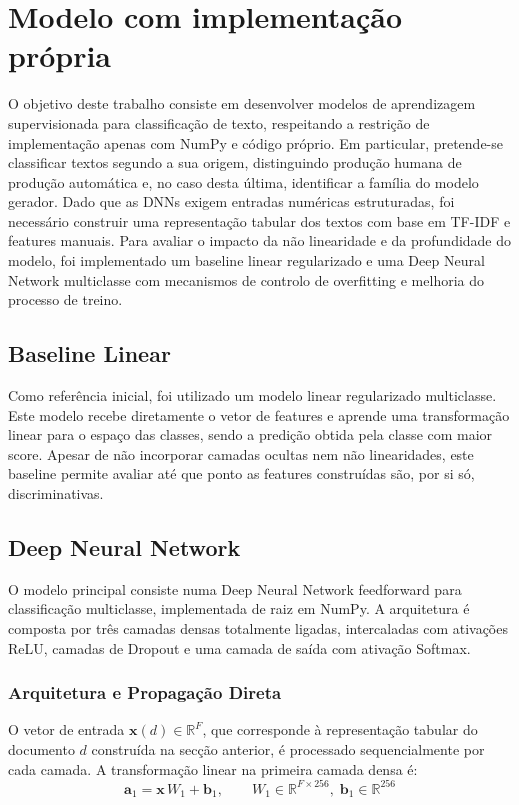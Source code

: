 \documentclass[a4paper,12pt]{scrreprt}
\begin{document}
    \section{Modelo com implementação própria}
        O objetivo deste trabalho consiste em desenvolver modelos de aprendizagem supervisionada para classificação de texto, respeitando a restrição de implementação apenas com NumPy e código próprio. Em particular, pretende-se classificar textos segundo a sua origem, distinguindo produção humana de produção automática e, no caso desta última, identificar a família do modelo gerador. Dado que as DNNs exigem entradas numéricas estruturadas, foi necessário construir uma representação tabular dos textos com base em TF-IDF e features manuais. Para avaliar o impacto da não linearidade e da profundidade do modelo, foi implementado um baseline linear regularizado e uma Deep Neural Network multiclasse com mecanismos de controlo de overfitting e melhoria do processo de treino.

        \subsection{Baseline Linear}
            Como referência inicial, foi utilizado um modelo linear regularizado multiclasse. Este modelo recebe diretamente o vetor de features e aprende uma transformação linear para o espaço das classes, sendo a predição obtida pela classe com maior score. Apesar de não incorporar camadas ocultas nem não linearidades, este baseline permite avaliar até que ponto as features construídas são, por si só, discriminativas.

        \subsection{Deep Neural Network}
            O modelo principal consiste numa Deep Neural Network feedforward para classificação multiclasse, implementada de raiz em NumPy. A arquitetura é composta por três camadas densas totalmente ligadas, intercaladas com ativações ReLU, camadas de Dropout e uma camada de saída com ativação Softmax.

            \subsubsection*{Arquitetura e Propagação Direta}

            O vetor de entrada $\mathbf{x}(d) \in \mathbb{R}^{F}$, que corresponde à representação tabular do documento $d$ construída na secção anterior, é processado sequencialmente por cada camada. A transformação linear na primeira camada densa é:
            \[
            \mathbf{a}_1 = \mathbf{x}\,W_1 + \mathbf{b}_1, \qquad W_1 \in \mathbb{R}^{F \times 256},\; \mathbf{b}_1 \in \mathbb{R}^{256}
            \]
\end{document}

